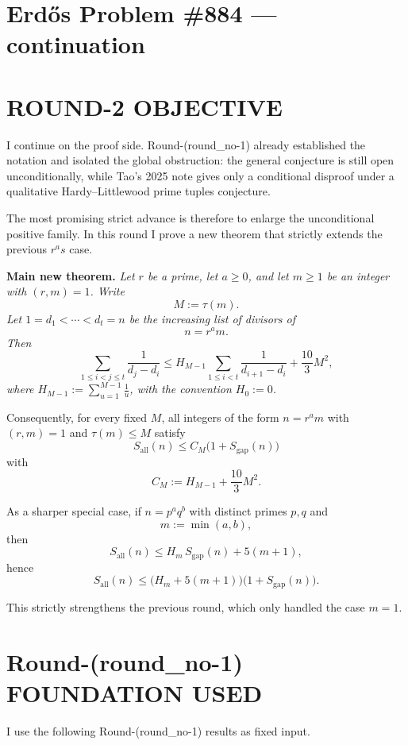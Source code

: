 \section{Erd\H{o}s Problem \#884 --- continuation}

\section{ROUND-2 OBJECTIVE}

I continue on the proof side. Round-(round\_no-1) already established the notation and isolated the global obstruction: the general conjecture is still open unconditionally, while Tao's 2025 note gives only a conditional disproof under a qualitative Hardy--Littlewood prime tuples conjecture.

The most promising strict advance is therefore to enlarge the unconditional positive family. In this round I prove a new theorem that strictly extends the previous \(r^a s\) case.

\medskip

\noindent\textbf{Main new theorem.}
\emph{Let \(r\) be a prime, let \(a\geq 0\), and let \(m\geq 1\) be an integer with \((r,m)=1\). Write}
\[
M:=\tau(m).
\]
\emph{Let \(1=d_1<\cdots<d_t=n\) be the increasing list of divisors of}
\[
n=r^a m.
\]
\emph{Then}
\[
\sum_{1\leq i<j\leq t}\frac{1}{d_j-d_i}
\leq
H_{M-1}\sum_{1\leq i<t}\frac{1}{d_{i+1}-d_i}
+\frac{10}{3}M^2,
\]
\emph{where \(H_{M-1}:=\sum_{u=1}^{M-1}\frac1u\), with the convention \(H_0:=0\).}

Consequently, for every fixed \(M\), all integers of the form \(n=r^a m\) with \((r,m)=1\) and \(\tau(m)\leq M\) satisfy
\[
S_{\mathrm{all}}(n)\leq C_M\bigl(1+S_{\mathrm{gap}}(n)\bigr)
\]
with
\[
C_M:=H_{M-1}+\frac{10}{3}M^2.
\]

As a sharper special case, if \(n=p^a q^b\) with distinct primes \(p,q\) and
\[
m:=\min(a,b),
\]
then
\[
S_{\mathrm{all}}(n)\leq H_m\,S_{\mathrm{gap}}(n)+5(m+1),
\]
hence
\[
S_{\mathrm{all}}(n)\leq \bigl(H_m+5(m+1)\bigr)\bigl(1+S_{\mathrm{gap}}(n)\bigr).
\]

This strictly strengthens the previous round, which only handled the case \(m=1\).

\section{Round-(round\_no-1) FOUNDATION USED}

I use the following Round-(round\_no-1) results as fixed input.

